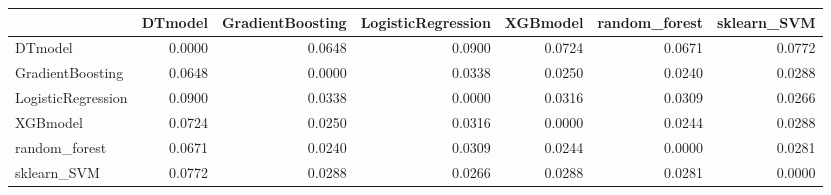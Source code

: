 \begin{tabular}{lrrrrrr}
\toprule
 & DTmodel & GradientBoosting & LogisticRegression & XGBmodel & random_forest & sklearn_SVM \\
\midrule
DTmodel & 0.0000 & 0.0648 & 0.0900 & 0.0724 & 0.0671 & 0.0772 \\
GradientBoosting & 0.0648 & 0.0000 & 0.0338 & 0.0250 & 0.0240 & 0.0288 \\
LogisticRegression & 0.0900 & 0.0338 & 0.0000 & 0.0316 & 0.0309 & 0.0266 \\
XGBmodel & 0.0724 & 0.0250 & 0.0316 & 0.0000 & 0.0244 & 0.0288 \\
random_forest & 0.0671 & 0.0240 & 0.0309 & 0.0244 & 0.0000 & 0.0281 \\
sklearn_SVM & 0.0772 & 0.0288 & 0.0266 & 0.0288 & 0.0281 & 0.0000 \\
\bottomrule
\end{tabular}
